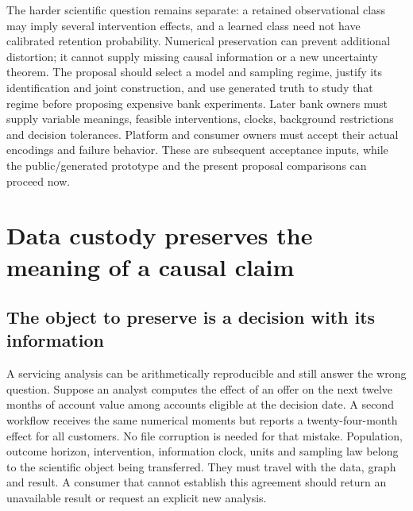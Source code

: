 The harder scientific question remains separate: a retained observational
class may imply several intervention effects, and a learned class need not
have calibrated retention probability. Numerical preservation can prevent
additional distortion; it cannot supply missing causal information or a new
uncertainty theorem. The proposal should select a model and sampling regime,
justify its identification and joint construction, and use generated truth to
study that regime before proposing expensive bank experiments. Later bank
owners must supply variable meanings, feasible interventions, clocks,
background restrictions and decision tolerances. Platform and consumer owners
must accept their actual encodings and failure behavior. These are subsequent
acceptance inputs, while the public/generated prototype and the present
proposal comparisons can proceed now.
\citep{exec16_topology_contract}
\label{exec16:topology-end}


\hypertarget{data-custody-preserves-the-meaning-of-a-causal-claim}{%
\section{Data custody preserves the meaning of a causal
claim}\label{data-custody-preserves-the-meaning-of-a-causal-claim}}

\label{exec14:artifact-custody}

\hypertarget{the-object-to-preserve-is-a-decision-with-its-information}{%
\subsection{The object to preserve is a decision with its
information}\label{the-object-to-preserve-is-a-decision-with-its-information}}

A servicing analysis can be arithmetically reproducible and still answer
the wrong question. Suppose an analyst computes the effect of an offer
on the next twelve months of account value among accounts eligible at
the decision date. A second workflow receives the same numerical moments
but reports a twenty-four-month effect for all customers. No file
corruption is needed for that mistake. Population, outcome horizon,
intervention, information clock, units and sampling law belong to the
scientific object being transferred. They must travel with the data,
graph and result. A consumer that cannot establish this agreement should
return an unavailable result or request an explicit new analysis.


